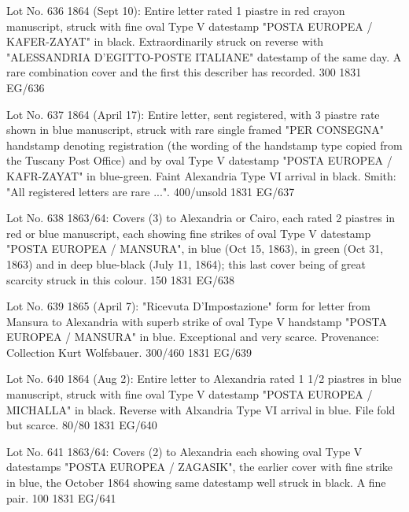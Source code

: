 \documentclass[justified]{tufte-book}
\begin{document}
%
{Lot No. 636
1864 (Sept 10): Entire letter rated 1 piastre in red crayon manuscript, struck with fine oval Type V datestamp "POSTA EUROPEA / KAFER-ZAYAT" in black. Extraordinarily struck on reverse with "ALESSANDRIA D'EGITTO-POSTE ITALIANE" datestamp of the same day. A rare combination cover and the first this describer has recorded. 300
}%
{1831}%
{EG/636}%
{}%
{}
{}%
{}

%
{Lot No. 637
1864 (April 17): Entire letter, sent registered, with 3 piastre rate shown in blue manuscript, struck with rare single framed "PER CONSEGNA" handstamp denoting registration (the wording of the handstamp type copied from the Tuscany Post Office) and by oval Type V datestamp "POSTA EUROPEA / KAFR-ZAYAT" in blue-green. Faint Alexandria Type VI arrival in black. Smith: "All registered letters are rare ...". 400/unsold
}%
{1831}%
{EG/637}%
{}%
{}
{}%
{}

%
{Lot No. 638
1863/64: Covers (3) to Alexandria or Cairo, each rated 2 piastres in red or blue manuscript, each showing fine strikes of oval Type V datestamp "POSTA EUROPEA / MANSURA", in blue (Oct 15, 1863), in green (Oct 31, 1863) and in deep blue-black (July 11, 1864); this last cover being of great scarcity struck in this colour. 150 
}%
{1831}%
{EG/638}%
{}%
{}
{}%
{}

%
{Lot No. 639
1865 (April 7): "Ricevuta D'Impostazione" form for letter from Mansura to Alexandria with superb strike of oval Type V handstamp "POSTA EUROPEA / MANSURA" in blue. Exceptional and very scarce. Provenance: Collection Kurt Wolfsbauer. 300/460 
}%
{1831}%
{EG/639}%
{}%
{}
{}%
{}

%
{Lot No. 640
1864 (Aug 2): Entire letter to Alexandria rated 1 1/2 piastres in blue manuscript, struck with fine oval Type V datestamp "POSTA EUROPEA / MICHALLA" in black. Reverse with Alxandria Type VI arrival in blue. File fold but scarce. 80/80 
}%
{1831}%
{EG/640}%
{}%
{}
{}%
{}

%
{Lot No. 641
1863/64: Covers (2) to Alexandria each showing oval Type V datestamps "POSTA EUROPEA / ZAGASIK", the earlier cover with fine strike in blue, the October 1864 showing same datestamp well struck in black. A fine pair. 100 
}%
{1831}%
{EG/641}%
{}%
{}
{}%
{}
\end{document}

